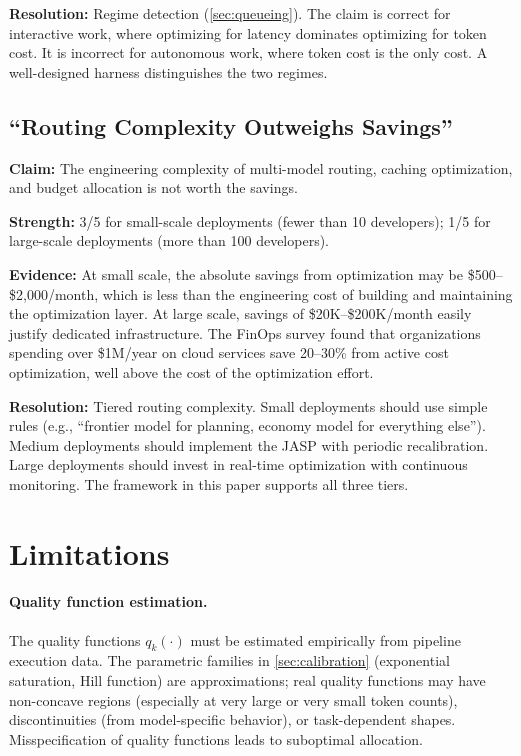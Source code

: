 \documentclass[11pt, a4paper, logo, copyright]{googledeepmind}
\begin{document}
\textbf{Resolution:} Regime detection (\cref{sec:queueing}). The claim is correct for interactive work, where optimizing for latency dominates optimizing for token cost. It is incorrect for autonomous work, where token cost is the only cost. A well-designed harness distinguishes the two regimes.

\subsection{``Routing Complexity Outweighs Savings''}

\textbf{Claim:} The engineering complexity of multi-model routing, caching optimization, and budget allocation is not worth the savings.

\textbf{Strength:} 3/5 for small-scale deployments (fewer than 10 developers); 1/5 for large-scale deployments (more than 100 developers).

\textbf{Evidence:} At small scale, the absolute savings from optimization may be \$500--\$2,000/month, which is less than the engineering cost of building and maintaining the optimization layer. At large scale, savings of \$20K--\$200K/month easily justify dedicated infrastructure. The FinOps survey \citep{finops2023} found that organizations spending over \$1M/year on cloud services save 20--30\% from active cost optimization, well above the cost of the optimization effort.

\textbf{Resolution:} Tiered routing complexity. Small deployments should use simple rules (e.g., ``frontier model for planning, economy model for everything else''). Medium deployments should implement the JASP with periodic recalibration. Large deployments should invest in real-time optimization with continuous monitoring. The framework in this paper supports all three tiers.


\section{Limitations}\label{sec:limitations}

\paragraph{Quality function estimation.}
The quality functions $q_k(\cdot)$ must be estimated empirically from pipeline execution data. The parametric families in \cref{sec:calibration} (exponential saturation, Hill function) are approximations; real quality functions may have non-concave regions (especially at very large or very small token counts), discontinuities (from model-specific behavior), or task-dependent shapes. Misspecification of quality functions leads to suboptimal allocation.
\end{document}
